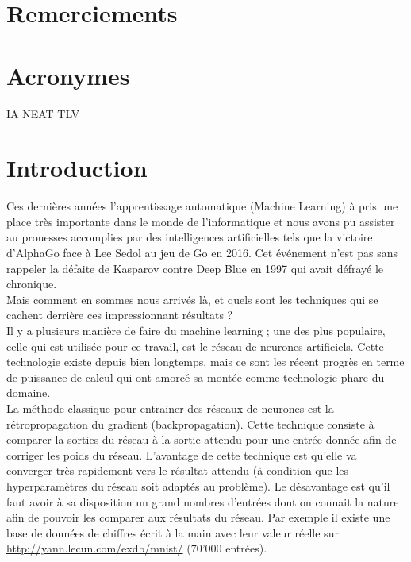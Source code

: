\documentclass{article}
\begin{document}


\tableofcontents

\newpage

\listoffigures

\newpage

\section*{Remerciements}
\section*{Acronymes}
IA
NEAT
TLV


\newpage
\section{Introduction}

Ces dernières années l'apprentissage automatique (Machine Learning) à pris une place très importante dans le monde de l'informatique et nous avons pu assister au prouesses accomplies par des intelligences artificielles tels que la victoire d'AlphaGo face à Lee Sedol au jeu de Go en 2016.\cite{wikialphagolee} Cet événement n'est pas sans rappeler la défaite de Kasparov contre Deep Blue en 1997 qui avait défrayé le chronique.\cite{kasparov}\\
Mais comment en sommes nous arrivés là, et quels sont les techniques qui se cachent derrière ces impressionnant résultats ?\\
Il y a plusieurs manière de faire du machine learning ; une des plus populaire, celle qui est utilisée pour ce travail, est le réseau de neurones artificiels. Cette technologie existe depuis bien longtemps, mais ce sont les récent progrès en terme de puissance de calcul qui ont amorcé sa montée comme technologie phare du domaine.\cite{nnpower}\\

La méthode classique pour entrainer des réseaux de neurones est la rétropropagation du gradient (backpropagation). Cette technique consiste à comparer la sorties du réseau à la sortie attendu pour une entrée donnée afin de corriger les poids du réseau.\cite{backprop} L'avantage de cette technique est qu'elle va converger très rapidement vers le résultat attendu (à condition que les hyperparamètres du réseau soit adaptés au problème). Le désavantage est qu'il faut avoir à sa disposition un grand nombres d'entrées dont on connait la nature afin de pouvoir les comparer aux résultats du réseau. Par exemple il existe une base de données de chiffres écrit à la main avec leur valeur réelle sur \url{http://yann.lecun.com/exdb/mnist/} (70'000 entrées).\\
\end{document}
